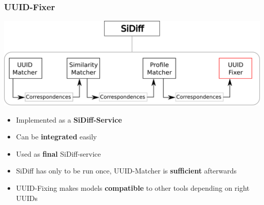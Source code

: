 \documentclass[10pt]{beamer}
\begin{document}
\begin{frame}
\frametitle{UUID-Fixer}
\begin{center}
\includegraphics[scale=0.4]{uuidfixer}\\
\end{center}
\begin{itemize}
  \item Implemented as a \textbf{SiDiff-Service}
  \item Can be \textbf{integrated} easily
  \item Used as \textbf{final} SiDiff-service 
  \item SiDiff has only to be run once, UUID-Matcher is \textbf{sufficient}
  afterwards
  \item UUID-Fixing makes models \textbf{compatible} to other tools depending on
  right UUIDs
\end{itemize}
\end{frame}
\end{document}
